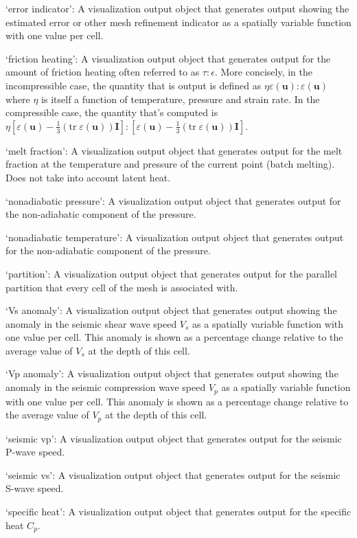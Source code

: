 \begin{itemize}
`error indicator': A visualization output object that generates output showing the estimated error or other mesh refinement indicator as a spatially variable function with one value per cell.

`friction heating': A visualization output object that generates output for the amount of friction heating often referred to as $\tau:\epsilon$. More concisely, in the incompressible case, the quantity that is output is defined as $\eta \varepsilon(\mathbf u):\varepsilon(\mathbf u)$ where $\eta$ is itself a function of temperature, pressure and strain rate. In the compressible case, the quantity that's computed is $\eta [\varepsilon(\mathbf u)-\tfrac 13(\textrm{tr}\;\varepsilon(\mathbf u))\mathbf I]:[\varepsilon(\mathbf u)-\tfrac 13(\textrm{tr}\;\varepsilon(\mathbf u))\mathbf I]$.

`melt fraction': A visualization output object that generates output for the melt fraction at the temperature and pressure of the current point (batch melting). Does not take into account latent heat.

`nonadiabatic pressure': A visualization output object that generates output for the non-adiabatic component of the pressure.

`nonadiabatic temperature': A visualization output object that generates output for the non-adiabatic component of the pressure.

`partition': A visualization output object that generates output for the parallel partition that every cell of the mesh is associated with.

`Vs anomaly': A visualization output object that generates output showing the anomaly in the seismic shear wave speed $V_s$ as a spatially variable function with one value per cell. This anomaly is shown as a percentage change relative to the average value of $V_s$ at the depth of this cell.

`Vp anomaly': A visualization output object that generates output showing the anomaly in the seismic compression wave speed $V_p$ as a spatially variable function with one value per cell. This anomaly is shown as a percentage change relative to the average value of $V_p$ at the depth of this cell.

`seismic vp': A visualization output object that generates output for the seismic P-wave speed.

`seismic vs': A visualization output object that generates output for the seismic S-wave speed.

`specific heat': A visualization output object that generates output for the specific heat $C_p$.


\end{itemize}
